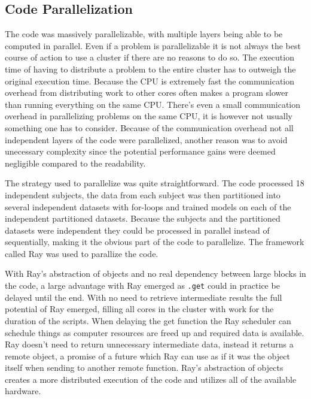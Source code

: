 \documentclass[12pt, a4paper]{article}
\begin{document}
\subsection{Code Parallelization}
The code was massively parallelizable, with multiple layers being able to be computed in parallel.
Even if a problem is parallelizable it is not always the best course of action to use a cluster if there are no reasons to do so.
The execution time of having to distribute a problem to the entire cluster has to outweigh the original execution time.
Because the CPU is extremely fast the communication overhead from distributing work to other cores often makes a program slower than running everything on the same CPU.
There's even a small communication overhead in parallelizing problems on the same CPU, it is however not usually something one has to consider.
Because of the communication overhead not all independent layers of the code were parallelized, another reason was to avoid unecessary complexity since the potential performance gains were deemed negligible compared to the readability.

The strategy used to parallelize was quite straightforward. 
The code processed 18 independent subjects, the data from each subject was then partitioned into several independent datasets with for-loops and trained models on each of the independent partitioned datasets. 
Because the subjects and the partitioned datasets were independent they could be processed in parallel instead of sequentially, making it the obvious part of the code to parallelize.
The framework called Ray was used to parallize the code. 

With Ray's abstraction of objects and no real dependency between large blocks in the code, a large advantage with Ray emerged as \texttt{.get} could in practice be delayed until the end.
With no need to retrieve intermediate results the full potential of Ray emerged, filling all cores in the cluster with work for the duration of the scripts.
When delaying the get function the Ray scheduler can schedule things as computer resources are freed up and required data is available.
Ray doesn't need to return unnecessary intermediate data, instead it returns a remote object, a promise of a future which Ray can use as if it was the object itself when sending to another remote function.
Ray's abstraction of objects creates a more distributed execution of the code and utilizes all of the available hardware.
\end{document}
